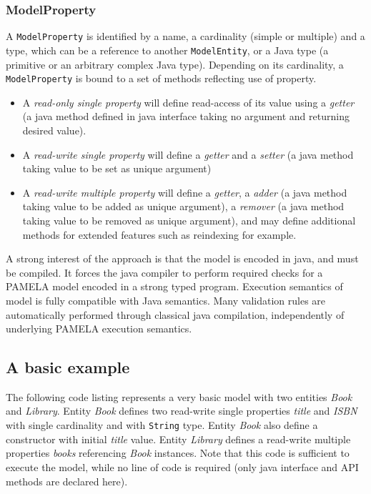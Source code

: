 \subsubsection{ModelProperty}

A \texttt{ModelProperty} is identified by a name, a cardinality (simple or multiple) and a type, which can be a reference to another \texttt{ModelEntity}, or a Java type (a primitive or an arbitrary complex Java type). Depending on its cardinality, a \texttt{ModelProperty} is bound to a set of methods reflecting use of property.
\begin{itemize}
    \item A \emph{read-only single property} will define read-access of its value using a \emph{getter} (a java method defined in java interface taking no argument and returning desired value).
    \item A \emph{read-write single property} will define a \emph{getter} and a \emph{setter} (a java method taking value to be set as unique argument)
    \item A \emph{read-write multiple property} will define a \emph{getter}, a \emph{adder} (a java method taking value to be added as unique argument), a \emph{remover} (a java method taking value to be removed as unique argument), and may define additional methods for extended features such as reindexing for example.
\end{itemize}

A strong interest of the approach is that the model is encoded in java, and must be compiled. It forces the java compiler to perform required checks for a PAMELA model encoded in a strong typed program. Execution semantics of model is fully compatible with Java semantics. Many validation rules are automatically performed through classical java compilation, independently of underlying PAMELA execution semantics.

\subsection{A basic example}

The following code listing represents a very basic model with two entities \emph{Book} and \emph{Library}. Entity \emph{Book} defines two read-write single properties \emph{title} and \emph{ISBN} with single cardinality and with \texttt{String} type. Entity \emph{Book} also define a constructor with initial \emph{title} value. Entity \emph{Library} defines a read-write multiple properties \emph{books} referencing \emph{Book} instances. Note that this code is sufficient to execute the model, while no line of code is required (only java interface and API methods are declared here). 

